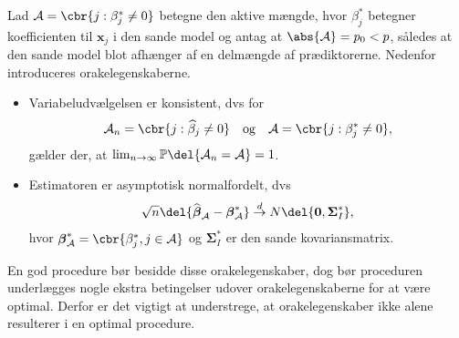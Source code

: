 Lad $\mathcal{A} =\cbr{j:\beta_j^* \neq 0}$ betegne den aktive mængde, hvor $\beta_j^*$ betegner koefficienten til $\mathbf{x}_j$ i den sande model og antag at $\abs{ \mathcal{A}}=p_0 <p$, således at den sande model blot afhænger af en delmængde af prædiktorerne.
Nedenfor introduceres orakelegenskaberne. 
\begin{defn}[Orakelegenskaber] \label{defn:orakel}
\begin{itemize}
\item Variabeludvælgelsen er konsistent, dvs for
\begin{align*}
\mathcal{A}_n=\cbr{ j :\widehat{\beta}_j \neq 0} \quad \text{og} \quad \mathcal{A} =\cbr{j:\beta_j^* \neq 0},
\end{align*}
gælder der, at $\lim_{n \rightarrow \infty } \mathbb{P}\del{\mathcal{A}_n=\mathcal{A}}=1$.
\item Estimatoren er asymptotisk normalfordelt, dvs
\begin{align*}
\sqrt{n}\del{\widehat{\boldsymbol{\beta}}_\mathcal{A}-\boldsymbol{\beta}^*_\mathcal{A}} \overset{d}{\rightarrow} N \del{\mathbf{0}, \boldsymbol{\Sigma}^*_I},
\end{align*}
hvor $\boldsymbol{\beta}^*_\mathcal{A}=\cbr{ \beta_j^*, j \in \mathcal{A}}$ og $\boldsymbol{\Sigma}^*_I$ er den sande kovariansmatrix.
\end{itemize}
\end{defn}
En god procedure bør besidde disse orakelegenskaber, dog bør proceduren underlægges nogle ekstra betingelser udover orakelegenskaberne for at være optimal.
Derfor er det vigtigt at understrege, at orakelegenskaber ikke alene resulterer i en optimal procedure.